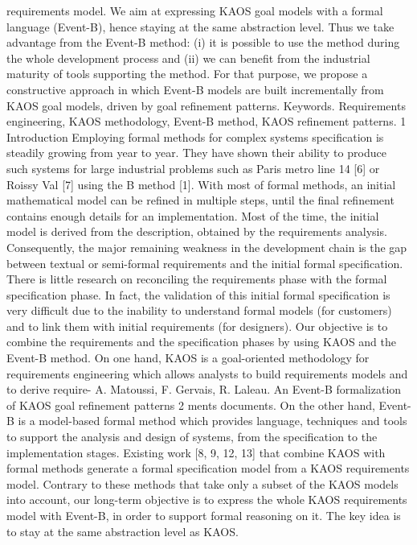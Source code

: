 requirements model. We aim at expressing KAOS goal models with a formal language
(Event-B), hence staying at the same abstraction level. Thus we take advantage from the
Event-B method: (i) it is possible to use the method during the whole development process and (ii) we can benefit from the industrial maturity of tools supporting the method.
For that purpose, we propose a constructive approach in which Event-B models are built
incrementally from KAOS goal models, driven by goal refinement patterns.
Keywords. Requirements engineering, KAOS methodology, Event-B method, KAOS
refinement patterns.
1 Introduction
Employing formal methods for complex systems specification is steadily growing from year
to year. They have shown their ability to produce such systems for large industrial problems
such as Paris metro line 14 [6] or Roissy Val [7] using the B method [1]. With most of
formal methods, an initial mathematical model can be refined in multiple steps, until the final
refinement contains enough details for an implementation. Most of the time, the initial model
is derived from the description, obtained by the requirements analysis. Consequently, the
major remaining weakness in the development chain is the gap between textual or semi-formal
requirements and the initial formal specification. There is little research on reconciling the
requirements phase with the formal specification phase. In fact, the validation of this initial
formal specification is very difficult due to the inability to understand formal models (for
customers) and to link them with initial requirements (for designers).
Our objective is to combine the requirements and the specification phases by using KAOS
and the Event-B method. On one hand, KAOS is a goal-oriented methodology for requirements engineering which allows analysts to build requirements models and to derive require-
A. Matoussi, F. Gervais, R. Laleau. An Event-B formalization of KAOS goal refinement patterns 2
ments documents. On the other hand, Event-B is a model-based formal method which provides language, techniques and tools to support the analysis and design of systems, from the
specification to the implementation stages. Existing work [8, 9, 12, 13] that combine KAOS
with formal methods generate a formal specification model from a KAOS requirements model.
Contrary to these methods that take only a subset of the KAOS models into account, our
long-term objective is to express the whole KAOS requirements model with Event-B, in order
to support formal reasoning on it. The key idea is to stay at the same abstraction level as
KAOS.

